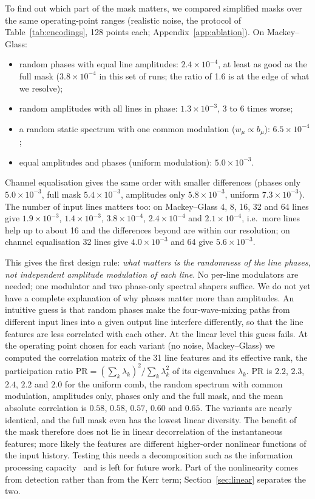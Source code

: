 To find out which part of the mask matters, we compared simplified masks over the same operating-point ranges (realistic noise,
the protocol of Table~\ref{tab:encodings}, 128 points each; Appendix~\ref{app:ablation}). On Mackey--Glass:
\begin{itemize}
\item random phases with equal line amplitudes: $2.4\times10^{-4}$, at least as good as the full mask ($3.8\times10^{-4}$ in this
      set of runs; the ratio of 1.6 is at the edge of what we resolve);
\item random amplitudes with all lines in phase: $1.3\times10^{-3}$, 3 to 6 times worse;
\item a random static spectrum with one common modulation ($w_\mu\propto b_\mu$): $6.5\times10^{-4}$;
\item equal amplitudes and phases (uniform modulation): $5.0\times10^{-3}$.
\end{itemize}
Channel equalisation gives the same order with smaller differences (phases only $5.0\times10^{-3}$, full mask $5.4\times10^{-3}$,
amplitudes only $5.8\times10^{-3}$, uniform $7.3\times10^{-3}$).
The number of input lines matters too: on Mackey--Glass 4, 8, 16, 32 and 64 lines give $1.9\times10^{-3}$, $1.4\times10^{-3}$,
$3.8\times10^{-4}$, $2.4\times10^{-4}$ and $2.1\times10^{-4}$, i.e.\ more lines help up to about 16 and the differences beyond are
within our resolution; on channel equalisation 32 lines give $4.0\times10^{-3}$ and 64 give $5.6\times10^{-3}$.

This gives the first design rule: \emph{what matters is the randomness of the line phases, not independent amplitude modulation of
each line}. No per-line modulators are needed; one modulator and two phase-only spectral shapers suffice.
We do not yet have a complete explanation of why phases matter more than amplitudes. An intuitive guess is that random phases make
the four-wave-mixing paths from different input lines into a given output line interfere differently, so that the line features are
less correlated with each other. At the linear level this guess fails. At the operating point chosen for each variant (no noise,
Mackey--Glass) we computed the correlation matrix of the 31 line features and its effective rank, the participation ratio
$\mathrm{PR}=(\sum_k\lambda_k)^2/\sum_k\lambda_k^2$ of its eigenvalues $\lambda_k$. PR is $2.2$, $2.3$, $2.4$, $2.2$ and $2.0$ for the uniform comb, the random
spectrum with common modulation, amplitudes only, phases only and the full mask, and the mean absolute correlation is $0.58$,
$0.58$, $0.57$, $0.60$ and $0.65$. The variants are nearly identical, and the full mask even has the lowest linear diversity. The
benefit of the mask therefore does not lie in linear decorrelation of the instantaneous features; more likely the features are
different higher-order nonlinear functions of the input history. Testing this needs a decomposition such as the information
processing capacity~\cite{dambre2012} and is left for future work. Part of the nonlinearity comes from detection rather than from the
Kerr term; Section~\ref{sec:linear} separates the two.


